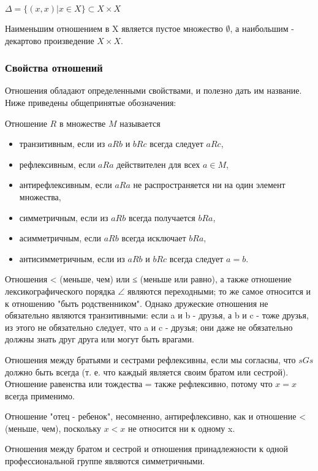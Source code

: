 \vspace{0.5cm}
\(\Delta = \{(x,x)|x \in X\} \subset X \times X\)

\vspace{0.5cm}

Наименьшим отношением в X является пустое множество \(\emptyset\), а наибольшим - декартово произведение \(X \times X\).

\subsubsection{Свойства отношений}
Отношения обладают определенными свойствами, и полезно дать им название. Ниже приведены общепринятые обозначения:

Отношение \(R\) в множестве \(M\) называется
\begin{itemize}
  \item транзитивным, если из \(aRb\) и \(bRc\) всегда следует \(aRc\),
  \item рефлексивным, если \(aRa\) действителен для всех \(a \in M\),
  \item антирефлексивным, если \(aRa\) не распространяется ни на один элемент множества,
  \item симметричным, если из \(aRb\) всегда получается \(bRa\),
  \item асимметричным, если \(aRb\) всегда исключает \(bRa\),
  \item антисимметричным, если из \(aRb\) и \(bRc\) всегда следует \(a=b\).
\end{itemize}

Отношения < (меньше, чем) или ≤ (меньше или равно), а также отношение лексикографического порядка \(\angle\) являются переходными;
то же самое относится и к отношению "быть родственником".
Однако дружеские отношения не обязательно являются транзитивными: если a и b - друзья, а b и c - тоже друзья, из этого не обязательно следует, что a и c - друзья;
они даже не обязательно должны знать друг друга или могут быть врагами.

Отношения между братьями и сестрами рефлексивны, если мы согласны, что \(sGs\) должно быть всегда (т. е.
что каждый является своим братом или сестрой). Отношение равенства или тождества = также рефлексивно, потому что \(x=x\) всегда применимо.

Отношение "отец - ребенок", несомненно, антирефлексивно, как и отношение < (меньше, чем), поскольку \(x < x\) не относится ни к одному x.

Отношения между братом и сестрой и отношения принадлежности к одной профессиональной группе являются симметричными.

